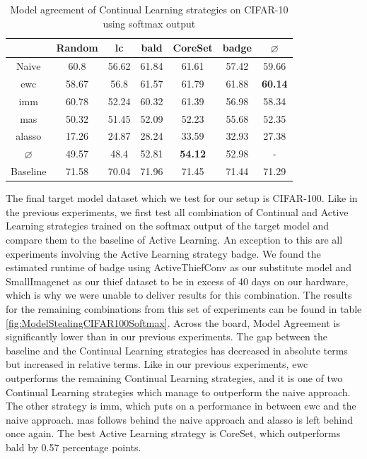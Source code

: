 \begin{table}[h]
    \centering
    \begin{tabular}{ c | c c c c c | c } 
         & Random & \gls{lc} & \gls{bald} & CoreSet & \gls{badge} & $\varnothing$\\ 
        \hline 
        Naive & 60.8 & 56.62 & 61.84 & 61.61 & 57.42 & 59.66 \\
        \gls{ewc} & 58.67 & 56.8 & 61.57 & 61.79 & 61.88 & \textbf{60.14}\\
        \gls{imm} & 60.78 & 52.24 & 60.32 & 61.39 & 56.98 & 58.34 \\
        \gls{mas} & 50.32 & 51.45 & 52.09 & 52.23 & 55.68 & 52.35\\
        \gls{alasso} & 17.26 & 24.87 & 28.24 & 33.59 & 32.93 & 27.38\\
        \hline
        $\varnothing$ & 49.57 & 48.4 & 52.81 & \textbf{54.12} & 52.98 & -\\
        Baseline & 71.58 & 70.04 & 71.96 & 71.45 & 71.44 & 71.29\\
    \end{tabular}
    \caption{Model agreement of Continual Learning strategies on CIFAR-10 using softmax output}
    \label{fig:ModelStealingCIFAR10Softmax}
\end{table}


The final target model dataset which we test for our setup is CIFAR-100. Like in the previous experiments, we first test all combination of Continual and Active Learning
strategies trained on the softmax output of the target model and compare them to the baseline of Active Learning. An exception to this are all experiments involving
the Active Learning strategy \gls{badge}. We found the estimated runtime of \gls{badge} using ActiveThiefConv as our substitute model and SmallImagenet as our thief dataset
to be in excess of 40 days on our hardware, which is why we were unable to deliver results for this combination. The results for the remaining combinations from this set
of experiments can be found in table \ref{fig:ModelStealingCIFAR100Softmax}. Across the board, Model Agreement is significantly lower than in our previous experiments.
The gap between the baseline and the Continual Learning strategies has decreased in absolute terms but increased in relative terms. Like in our previous experiments,
\gls{ewc} outperforms the remaining Continual Learning strategies, and it is one of two Continual Learning strategies which manage to outperform the naive approach.
The other strategy is \gls{imm}, which puts on a performance in between \gls{ewc} and the naive approach. \gls{mas} follows behind the naive approach
and \gls{alasso} is left behind once again. The best Active Learning strategy is CoreSet, which outperforms \gls{bald} by 0.57 percentage points. \par

